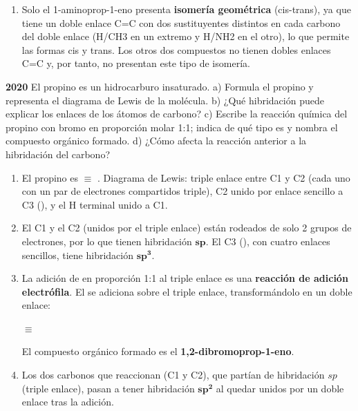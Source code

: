 \begin{exerciseEVAU}
\begin{solu}
\begin{enumerate}[label=\letraminuscula]
            \item[b.3)] Solo el 1-aminoprop-1-eno presenta \textbf{isomería geométrica} (cis-trans), ya que tiene un doble enlace C=C con dos sustituyentes distintos en cada carbono del doble enlace (H/CH3 en un extremo y H/NH2 en el otro), lo que permite las formas cis y trans. Los otros dos compuestos no tienen dobles enlaces C=C y, por tanto, no presentan este tipo de isomería.
        \end{enumerate}
    \end{solu}
\end{exerciseEVAU}
\begin{exerciseEVAU}
    \textbf{ 2020} El propino es un hidrocarburo insaturado. a) Formula el propino y representa el diagrama de Lewis de la molécula. b) ¿Qué hibridación puede explicar los enlaces de los átomos de carbono? c) Escribe la reacción química del propino con bromo en proporción molar 1:1; indica de qué tipo es y nombra el compuesto orgánico formado. d) ¿Cómo afecta la reacción anterior a la hibridación del carbono?

    \begin{solu}


        \begin{enumerate}[label=\letraminuscula]
            \item El propino es  \(\equiv\) . Diagrama de Lewis: triple enlace entre C1 y C2 (cada uno con un par de electrones compartidos triple), C2 unido por enlace sencillo a C3 (), y el H terminal unido a C1.

            \item El C1 y el C2 (unidos por el triple enlace) están rodeados de solo 2 grupos de electrones, por lo que tienen hibridación \(\bm{sp}\). El C3 (), con cuatro enlaces sencillos, tiene hibridación \(\bm{sp^3}\).

            \item La adición de  en proporción 1:1 al triple enlace es una \textbf{reacción de adición electrófila}. El  se adiciona sobre el triple enlace, transformándolo en un doble enlace:
            \begin{center}
                 \(\equiv\) 
            \end{center}
            El compuesto orgánico formado es el \textbf{1,2-dibromoprop-1-eno}.

            \item Los dos carbonos que reaccionan (C1 y C2), que partían de hibridación \(sp\) (triple enlace), pasan a tener hibridación \(\bm{sp^2}\) al quedar unidos por un doble enlace tras la adición.
        \end{enumerate}
    \end{solu}
\end{exerciseEVAU}

